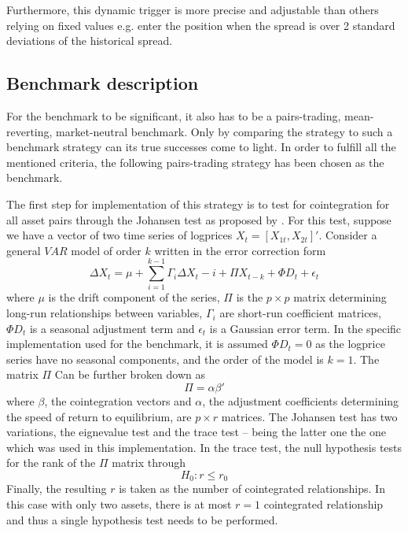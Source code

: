 Furthermore, this dynamic trigger is more precise and adjustable than others relying on fixed values e.g. enter the position when the spread is over 2 standard deviations of the historical spread.

\subsection{Benchmark description}
For the benchmark to be significant, it also has to be a pairs-trading, mean-reverting, market-neutral benchmark. Only by comparing the strategy to such a benchmark strategy can its true successes come to light. In order to fulfill all the mentioned criteria, the following pairs-trading strategy has been chosen as the benchmark. 

The first step for implementation of this strategy is to test for cointegration for all asset pairs through the Johansen test as proposed by \cite{johansen_1991}. 
For this test, suppose we have a vector of two time series of logprices  $X_t=[X_{1t},X_{2t}]'$. 
Consider a general $VAR$ model of order $k$ written in the error correction form 
\begin{equation}
    \Delta X_t = \mu + \sum_{i=1}^{k-1}{\Gamma_i \Delta X_t-i} + \Pi X_{t-k} + \Phi D_t + \epsilon_t
\end{equation}
where $\mu$ is the drift component of the series, $\Pi$ is the $p\times p$ matrix determining long-run relationships between variables, $\Gamma_i$ are short-run coefficient matrices, $\Phi D_t$ is a seasonal adjustment term and $\epsilon_t$ is a Gaussian error term. In the specific implementation used for the benchmark, it is assumed $\Phi D_t=0$ as the logprice series have no seasonal components, and the order of the model is $k=1$. 
The matrix $\Pi$ Can be further broken down as 
\begin{equation}
    \Pi=\alpha \beta '
\end{equation}
where $\beta$, the cointegration vectors and $\alpha$, the adjustment coefficients determining the speed of return to equilibrium, are $p\times r$ matrices. 
The Johansen test has two variations, the eignevalue test and the trace test -- being the latter one the one which was used in this implementation. In the trace test, the null hypothesis tests for the rank of the $\Pi$ matrix through
\begin{equation}
    H_0: r \leq r_0
\end{equation}
Finally, the resulting $r$ is taken as the number of cointegrated relationships. In this case with only two assets, there is at most $r=1$ cointegrated relationship and thus a single hypothesis test needs to be performed. 

